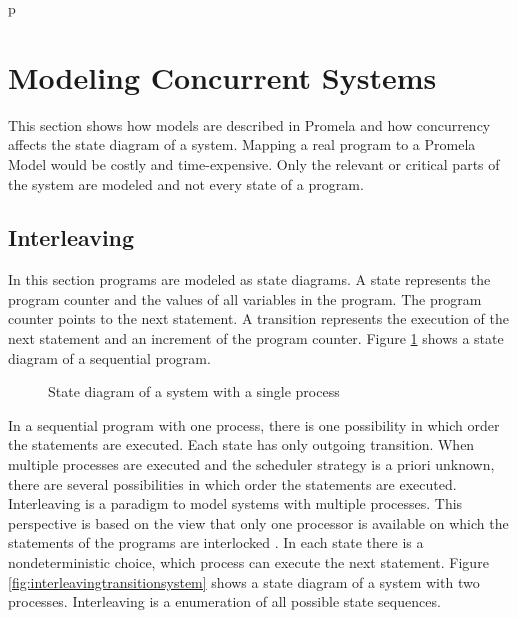 p\documentclass[a4paper, twoside]{article}
\begin{document}
\section{Modeling Concurrent Systems}
\label{sec:concurrency}

This section shows how models are described in Promela and how concurrency affects the state diagram of a system. Mapping a real program to a Promela Model would be costly and time-expensive. Only the relevant or critical parts of the system are modeled and not every state of a program.


\subsection{Interleaving}
\label{sec:interleaving}

In this section programs are modeled as state diagrams. A state represents the program counter and the values of all variables in the program. The program counter points to the next statement. A transition represents the execution of the next statement and an increment of the program counter. Figure \ref{fig:sequencielstatediagram} shows a state diagram of a sequential program. 

\begin{figure}
 \centering

  \caption{State diagram of a system with a single process}
  \label{fig:sequencielstatediagram}
\end{figure}

In a sequential program with one process, there is one possibility in which order the statements are executed. Each state has only outgoing transition. When multiple processes are executed and the scheduler strategy is a priori unknown, there are several possibilities in which order the statements are executed. Interleaving is a paradigm to model systems with multiple processes. This perspective is based on the view that only one processor is available on which the statements of the programs are interlocked \cite{baier08}. In each state there is a nondeterministic choice, which process can execute the next statement. Figure \ref{fig:interleavingtransitionsystem} shows a state diagram of a system with two processes. Interleaving is a enumeration of all possible state sequences.
\end{document}

